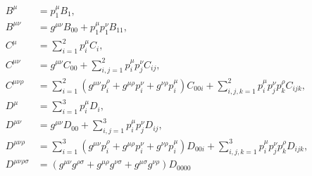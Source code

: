 \begin{draft}
    \begin{subequations}
        \begin{align}
            B^\mu                & = p_1^\mu B_1,                                                                                                                                                                                                         \\
            B^{\mu\nu}           & = g^{\mu\nu} B_{00} + p_1^\mu p_1^\nu B_{11},                                                                                                                                                                          \\
            C^\mu                & = \sum_{i=1}^2 p_i^\mu C_i,                                                                                                                                                                                            \\
            C^{\mu\nu}           & = g^{\mu\nu} C_{00} + \sum_{i,j=1}^{2} p_i^\mu p_j^\nu C_{ij},                                                                                                                                                         \\
            C^{\mu\nu\rho}       & = \sum_{i=1}^2 (g^{\mu\nu} p_i^{\rho} + g^{\mu\rho} p_i^{\nu} + g^{\nu\rho} p_i^{\mu}) C_{00i} + \sum_{i,j,k=1}^2 p_i^\mu p_j^\nu p_k^\rho C_{ijk},                                                                    \\
            D^\mu                & = \sum_{i=1}^3 p_i^\mu D_i,                                                                                                                                                                                            \\
            D^{\mu\nu}           & = g^{\mu\nu} D_{00} + \sum_{i,j=1}^{3} p_i^\mu p_j^\nu D_{ij},                                                                                                                                                         \\
            D^{\mu\nu\rho}       & = \sum_{i=1}^3 (g^{\mu\nu} p_i^{\rho} + g^{\mu\rho} p_i^{\nu} + g^{\nu\rho} p_i^{\mu}) D_{00i} + \sum_{i,j,k=1}^3 p_i^\mu p_j^\nu p_k^\rho D_{ijk},                                                                    \\
            \nonumber
            D^{\mu\nu\rho\sigma} & = (g^{\mu\nu}g^{\rho\sigma} + g^{\mu\rho}g^{\nu\sigma} + g^{\mu\sigma}g^{\nu\rho})D_{0000}                                                                                                                             \\

\end{align}
\end{subequations}
\end{draft}
